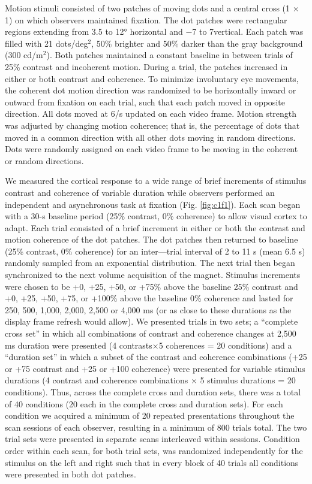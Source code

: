 \documentclass{report}
\begin{document}
Motion stimuli consisted of two patches of moving dots and a central cross (1 $\times$ 1\degree) on which observers maintained fixation. The dot patches were rectangular regions extending from 3.5 to 12° horizontal and −7 to 7\degree vertical. Each patch was filled with 21 dots/deg$^2$, 50\% brighter and 50\% darker than the gray background (300 cd/m$^2$). Both patches maintained a constant baseline in between trials of 25\% contrast and incoherent motion. During a trial, the patches increased in either or both contrast and coherence. To minimize involuntary eye movements, the coherent dot motion direction was randomized to be horizontally inward or outward from fixation on each trial, such that each patch moved in opposite direction. All dots moved at 6\degree /s updated on each video frame. Motion strength was adjusted by changing motion coherence; that is, the percentage of dots that moved in a common direction with all other dots moving in random directions. Dots were randomly assigned on each video frame to be moving in the coherent or random directions.

We measured the cortical response to a wide range of brief increments of stimulus contrast and coherence of variable duration while observers performed an independent and asynchronous task at fixation (Fig. \ref{fig:c1f1}). Each scan began with a 30-s baseline period (25\% contrast, 0\% coherence) to allow visual cortex to adapt. Each trial consisted of a brief increment in either or both the contrast and motion coherence of the dot patches. The dot patches then returned to baseline (25\% contrast, 0\% coherence) for an inter---trial interval of 2 to 11 s (mean 6.5 s) randomly sampled from an exponential distribution. The next trial then began synchronized to the next volume acquisition of the magnet. Stimulus increments were chosen to be +0, +25, +50, or +75\% above the baseline 25\% contrast and +0, +25, +50, +75, or +100\% above the baseline 0\% coherence and lasted for 250, 500, 1,000, 2,000, 2,500 or 4,000 ms (or as close to these durations as the display frame refresh would allow). We presented trials in two sets; a “complete cross set” in which all combinations of contrast and coherence changes at 2,500 ms duration were presented (4 contrasts×5 coherences = 20 conditions) and a “duration set” in which a subset of the contrast and coherence combinations (+25 or +75 contrast and +25 or +100 coherence) were presented for variable stimulus durations (4 contrast and coherence combinations $\times$ 5 stimulus durations = 20 conditions). Thus, across the complete cross and duration sets, there was a total of 40 conditions (20 each in the complete cross and duration sets). For each condition we acquired a minimum of 20 repeated presentations throughout the scan sessions of each observer, resulting in a minimum of 800 trials total. The two trial sets were presented in separate scans interleaved within sessions. Condition order within each scan, for both trial sets, was randomized independently for the stimulus on the left and right such that in every block of 40 trials all conditions were presented in both dot patches.
\end{document}
